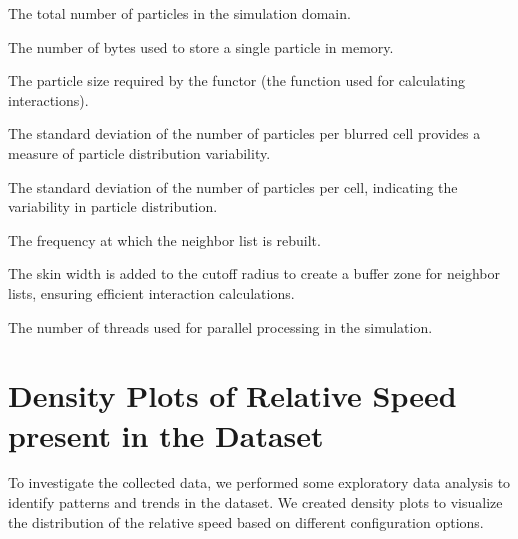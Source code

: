 \begin{description}[style=multiline, leftmargin =40mm]
  \item [numParticles] The total number of particles in the simulation domain.
  \item [particleSize] The number of bytes used to store a single particle in memory.
  \item [particleSizeNeededByFunctor] The particle size required by the functor (the function used for calculating interactions).
  \item [particlesPerBlurredCellStdDev] The standard deviation of the number of particles per blurred cell provides a measure of particle distribution variability.
  \item [particlesPerCellStdDev] The standard deviation of the number of particles per cell, indicating the variability in particle distribution.
  \item [rebuildFrequency] The frequency at which the neighbor list is rebuilt.
  \item [skin] The skin width is added to the cutoff radius to create a buffer zone for neighbor lists, ensuring efficient interaction calculations.
  \item [threadCount] The number of threads used for parallel processing in the simulation.
\end{description}



\section{Density Plots of Relative Speed present in the Dataset}

To investigate the collected data, we performed some exploratory data analysis to identify patterns and trends in the dataset. We created density plots to visualize the distribution of the relative speed based on different configuration options.

